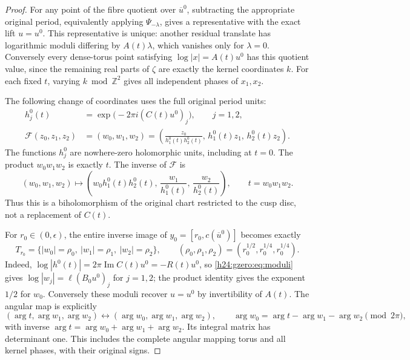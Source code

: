 \begin{proof}
For any point of the fibre quotient over \(\overline u^0\), subtracting
the appropriate original period, equivalently applying
\(\Psi_{-\lambda}\), gives a representative with the exact lift
\(u=u^0\). This representative is unique: another residual translate
has logarithmic moduli differing by \(A(t)\lambda\), which vanishes
only for \(\lambda=0\). Conversely every dense-torus point satisfying
\(\log|x|=A(t)u^0\) has this quotient value, since the remaining real
parts of \(\zeta\) are exactly the kernel coordinates \(k\).
For each fixed \(t\), varying \(k\bmod\mathbb Z^2\) gives all independent
phases of \(x_1,x_2\).

The following change of coordinates uses the full original period units:
\begin{align}
 h_j^0(t)&=\exp\bigl(-2\pi i(C(t)u^0)_j\bigr),\qquad j=1,2,\\
 \mathcal F(z_0,z_1,z_2)
 &=(w_0,w_1,w_2)
 =\left(\frac{z_0}{h_1^0(t)h_2^0(t)},\,
 h_1^0(t)z_1,\,h_2^0(t)z_2\right).
 \label{h24:gzero:eq:straightening}
\end{align}
The functions \(h_j^0\) are nowhere-zero holomorphic units, including
at \(t=0\). The product \(w_0w_1w_2\) is exactly \(t\).
The inverse of \(\mathcal F\) is
\[
 (w_0,w_1,w_2)\longmapsto
 \left(w_0h_1^0(t)h_2^0(t),\,
 \frac{w_1}{h_1^0(t)},\,\frac{w_2}{h_2^0(t)}\right),
 \qquad t=w_0w_1w_2.
\]
Thus this is a biholomorphism of the original chart restricted to the
cusp disc, not a replacement of \(C(t)\).

For \(r_0\in(0,\epsilon)\), the entire inverse image of
\(y_0=[r_0,c(\overline u^0)]\) becomes exactly
\begin{equation}
 T_{r_0}=
 \{|w_0|=\rho_0,\ |w_1|=\rho_1,\ |w_2|=\rho_2\},\qquad
 (\rho_0,\rho_1,\rho_2)=
 (r_0^{1/2},r_0^{1/4},r_0^{1/4}).
 \label{h24:gzero:eq:torus}
\end{equation}
Indeed, \(\log|h^0(t)|=2\pi\operatorname{Im}C(t)u^0=-R(t)u^0\),
so \eqref{h24:gzero:eq:moduli} gives \(\log|w_j|=\ell(B_0u^0)_j\) for
\(j=1,2\); the product identity gives the exponent \(1/2\) for
\(w_0\). Conversely these moduli recover \(u=u^0\) by invertibility
of \(A(t)\). The angular map is explicitly
\[
 (\arg t,\arg w_1,\arg w_2)\longleftrightarrow
 (\arg w_0,\arg w_1,\arg w_2),\qquad
 \arg w_0=\arg t-\arg w_1-\arg w_2\pmod{2\pi},
\]
with inverse \(\arg t=\arg w_0+\arg w_1+\arg w_2\).
Its integral matrix has determinant one. This includes the complete
angular mapping torus and all kernel phases, with their original signs.


\end{proof}
